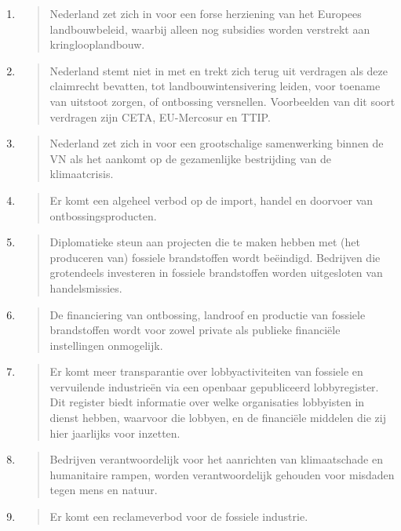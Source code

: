 \begin{enumerate}
\def\labelenumi{\arabic{enumi}.}
\item
  \begin{quote}
  Nederland zet zich in voor een forse herziening van het Europees
  landbouwbeleid, waarbij alleen nog subsidies worden verstrekt aan
  kringlooplandbouw.
  \end{quote}
\item
  \begin{quote}
  Nederland stemt niet in met en trekt zich terug uit verdragen als deze
  claimrecht bevatten, tot landbouwintensivering leiden, voor toename
  van uitstoot zorgen, of ontbossing versnellen. Voorbeelden van dit
  soort verdragen zijn CETA, EU-Mercosur en TTIP.
  \end{quote}
\item
  \begin{quote}
  Nederland zet zich in voor een grootschalige samenwerking binnen de VN
  als het aankomt op de gezamenlijke bestrijding van de klimaatcrisis.
  \end{quote}
\item
  \begin{quote}
  Er komt een algeheel verbod op de import, handel en doorvoer van
  ontbossingsproducten.
  \end{quote}
\item
  \begin{quote}
  Diplomatieke steun aan projecten die te maken hebben met (het
  produceren van) fossiele brandstoffen wordt beëindigd. Bedrijven die
  grotendeels investeren in fossiele brandstoffen worden uitgesloten van
  handelsmissies.
  \end{quote}
\item
  \begin{quote}
  De financiering van ontbossing, landroof en productie van fossiele
  brandstoffen wordt voor zowel private als publieke financiële
  instellingen onmogelijk.
  \end{quote}
\item
  \begin{quote}
  Er komt meer transparantie over lobbyactiviteiten van fossiele en
  vervuilende industrieën via een openbaar gepubliceerd lobbyregister.
  Dit register biedt informatie over welke organisaties lobbyisten in
  dienst hebben, waarvoor die lobbyen, en de financiële middelen die zij
  hier jaarlijks voor inzetten.
  \end{quote}
\item
  \begin{quote}
  Bedrijven verantwoordelijk voor het aanrichten van klimaatschade en
  humanitaire rampen, worden verantwoordelijk gehouden voor misdaden
  tegen mens en natuur.
  \end{quote}
\item
  \begin{quote}
  Er komt een reclameverbod voor de fossiele industrie.
  \end{quote}
\end{enumerate}

